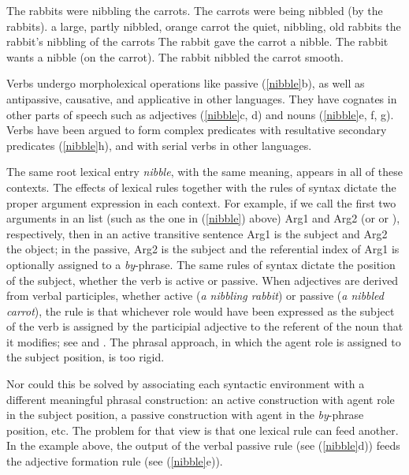\documentclass[output=paper
                ,modfonts
                ,nonflat
	        ,collection
	        ,collectionchapter
	        ,collectiontoclongg
 	        ,biblatex
                ,babelshorthands
                ,newtxmath
                ,draftmode
                ,colorlinks, citecolor=brown
]{./langsci/langscibook}
\begin{document}
\begin{exe}
\ex \label{nibble}
\begin{xlist}
\ex  The rabbits were nibbling the carrots.  
\ex  The carrots were being nibbled (by the rabbits).
\ex  a large, partly nibbled, orange carrot 
\ex  the quiet, nibbling, old rabbits
\ex  the rabbit's nibbling of the carrots
\ex  The rabbit gave the carrot a nibble.  
\ex  The rabbit wants a nibble (on the carrot).  
\ex  The rabbit nibbled the carrot smooth.
\end{xlist}
\end{exe}

\noindent
Verbs undergo  morpholexical operations like passive
(\ref{nibble}b), as well as antipassive, causative, and applicative in other languages.  They have cognates in
other parts of speech such as adjectives  (\ref{nibble}c, d) and nouns  (\ref{nibble}e, f, g).  
Verbs have been argued to form complex predicates with resultative secondary predicates (\ref{nibble}h), and with serial verbs in other languages.   

The same root lexical entry \emph{nibble}, with the same meaning, appears in all of these contexts.
The effects of lexical rules together with the rules of syntax dictate the proper argument
expression in each context.  For example, if we call the first two arguments in an \argst list
(such as the one in (\ref{nibble}) above) Arg1 and Arg2 (or  or ), respectively, then in an active
transitive sentence Arg1 is the subject and Arg2 the object; in the passive, Arg2 is the subject and
the referential index of Arg1 is optionally assigned to a \emph{by}-phrase.  The same rules of
syntax dictate the position of the subject, whether the verb is active or passive.  When adjectives
are derived from verbal participles, whether active (\emph{a nibbling rabbit}) or passive (\emph{a
  nibbled carrot}), the rule is that whichever role would have been expressed as the subject of the
verb is assigned by the participial adjective to the referent of the noun that it modifies; see \citet{Bresnan:1982passive} 
and \citet[Chapter~3]{Bresnan+etal:2015}.  
The phrasal approach, in which the agent role is assigned to the subject position, is too rigid.  

Nor could this be solved by associating each syntactic environment with a different meaningful phrasal construction: an active construction with agent role in the subject position, a passive construction with agent in the \textit{by}-phrase position, etc.  The problem for that view is that one lexical rule can feed another.  In the example above, the output of the verbal passive rule (see (\ref{nibble}d)) feeds the adjective formation rule (see (\ref{nibble}e)).  
 
\end{document}

